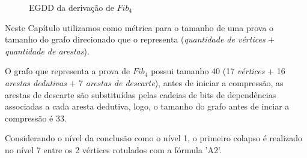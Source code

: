 \begin{figure}[!ht]
\begin{center}
\begin{tikzpicture}[state/.style={rectangle, inner sep=5pt},  node distance=1cm]
        \end{tikzpicture}
        \caption{EGDD da derivação de $Fib_4$}
        \label{fig:der_fib4}
    \end{center}
\end{figure}

Neste Capítulo utilizamos como métrica para o tamanho de uma prova o tamanho do grafo direcionado que o representa (\textit{quantidade de vértices} $+$ \textit{quantidade de arestas}).

O grafo que representa a prova de $Fib_4$ possui tamanho 40 (17 \textit{vértices} $+$ 16 \textit{arestas dedutivas} $+$ 7 \textit{arestas de descarte}), antes de iniciar a compressão, as arestas de descarte são substituídas pelas cadeias de bits de dependências associadas a cada aresta dedutiva, logo, o tamanho do grafo antes de inciar a compressão é 33.


Considerando o nível da conclusão como o nível 1, o primeiro colapso é realizado no nível 7 entre os 2 vértices rotulados com a fórmula 'A2'.

